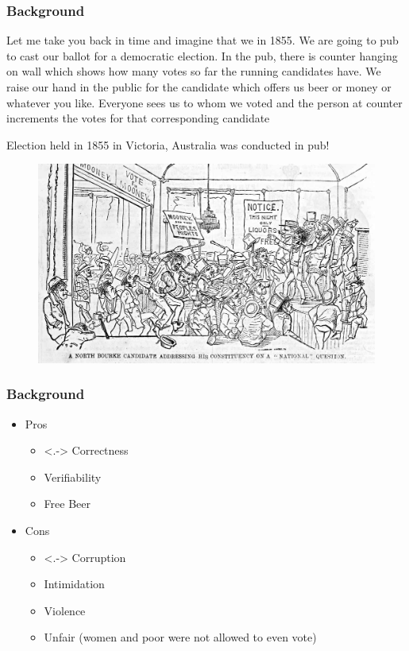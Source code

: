 \documentclass{beamer}
\begin{document}
\begin{frame}
\frametitle{Background}
{Let me take you back in time and imagine that 
we in 1855. We are going to pub to cast our ballot for a democratic election. 
In the pub, there is counter hanging on wall which shows how many votes 
so far the running  candidates have. 
We raise our hand in the public for the candidate which offers us
beer or money or whatever you like. Everyone sees us to whom we 
voted and the person at counter increments the votes for 
that corresponding candidate}

{Election held in 1855 in Victoria, Australia 
	  was conducted in pub!}
\begin{figure}
	\begin{center}
	\includegraphics[scale=0.20]{NorthBourke.jpg}
	\end{center}
  \end{figure}   
\end{frame}

\begin{frame}
\frametitle{Background}
\begin{itemize}[]
\item Pros 
\begin{itemize}
\item<.-> Correctness
\item Verifiability
\item Free Beer
\end{itemize}
\item Cons
\begin{itemize}
\item<.-> Corruption
\item Intimidation
\item Violence
\item Unfair (women and poor were not allowed to even vote)
\end{itemize}
\end{itemize}
\end{frame}
\end{document}
